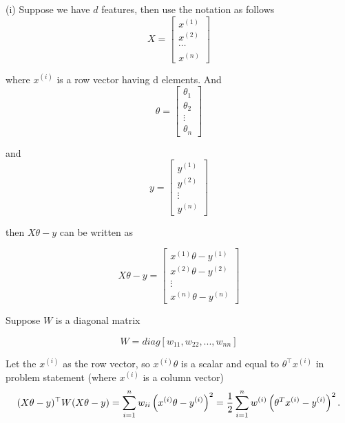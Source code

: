 \begin{answer}

(i) Suppose we have $d$ features, then use the notation as follows
\begin{equation*}
    X = \left[\begin{matrix}
       x^{(1)} \\ x^{(2)} \\ \cdots \\ x^{(n)}
      \end{matrix}
    \right]
  \end{equation*}

where $x^{(i)}$ is a row vector having d elements. And 
\begin{equation*}
\theta = \left[\begin{matrix}
       \theta_1 \\
       \theta_2 \\
       \vdots \\
       \theta_n
      \end{matrix}
    \right]
\end{equation*}

and 
\begin{equation*}
y = \left[\begin{matrix}
       y^{(1)} \\
       y^{(2)} \\
       \vdots \\
       y^{(n)}
      \end{matrix}
    \right]
\end{equation*}

then $X\theta - y$ can be written as 

\begin{equation*}
X\theta - y = \left[\begin{matrix}
       x^{(1)}\theta - y^{(1)} \\
       x^{(2)}\theta - y^{(2)} \\
       \vdots \\
       x^{(n)}\theta - y^{(n)}
      \end{matrix}
    \right]
\end{equation*}

Suppose $W$ is a diagonal matrix

\begin{equation*}
W = diag\left[ w_{11}, w_{22}, ..., w_{nn} \right]
\end{equation*}

Let the $x^{(i)}$ as the row vector, so $x^{(i)}\theta$ is a scalar and equal to $\theta^\top x^{(i)}$ in problem statement (where $x^{(i)}$ is a column vector)
\begin{equation*}
    (X\theta - y)^\top W (X\theta - y) = \sum_{i=1}^{n} w_{ii}\left(x^{(i)}\theta - y^{(i)}\right)^2 = \frac{1}{2} \sum_{i=1}^{n} w^{(i)}
		\left(\theta^Tx^{(i)} - y^{(i)}\right)^2.
\end{equation*}


\end{answer}
